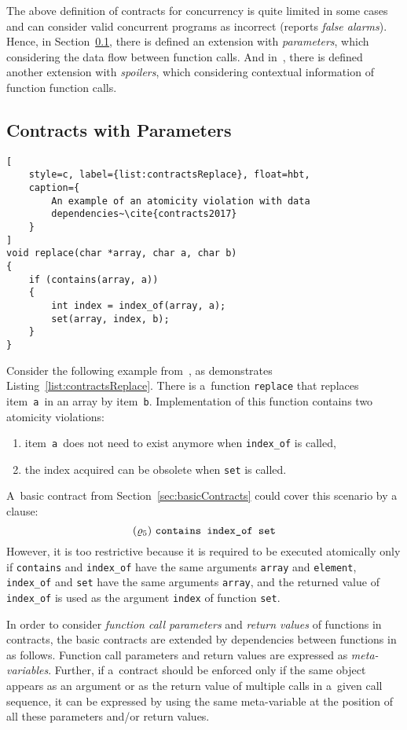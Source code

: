 The above definition of contracts for concurrency is quite limited in
some cases and can consider valid concurrent programs as incorrect (reports
\emph{false alarms}). Hence, in Section~\ref{sec:parameterContracts},
there is defined an extension with \emph{parameters}, which considering the
data flow between function calls. And in~\cite{contracts2017}, there
is defined another extension with \emph{spoilers}, which considering
contextual information of function function calls.


\subsection{Contracts with Parameters}
\label{sec:parameterContracts}

\begin{lstlisting}[
    style=c, label={list:contractsReplace}, float=hbt,
    caption={
        An example of an atomicity violation with data
        dependencies~\cite{contracts2017}
    }
]
void replace(char *array, char a, char b)
{
    if (contains(array, a))
    {
        int index = index_of(array, a);
        set(array, index, b);
    }
}
\end{lstlisting}

Consider the following example from~\cite{contracts2017}, as demonstrates
Listing~\ref{list:contractsReplace}. There is a~function \texttt{replace}
that replaces item~\texttt{a}~in an array by item~\texttt{b}. Implementation
of this function contains two atomicity violations:
\begin{enumerate}[label={(\roman*)}]
    \item 
        item~\texttt{a}~does not need to exist anymore when \texttt{index\_of}
        is called,
        
    \item
        the index acquired can be obsolete when \texttt{set} is called.
\end{enumerate}
A~basic contract from Section~\ref{sec:basicContracts} could cover
this scenario by a clause:
$$ (\varrho_5)\ \text{\texttt{contains index\_of set}} $$
However, it is too restrictive because it is required to be executed
atomically only if \texttt{contains} and \texttt{index\_of} have the same
arguments \texttt{array} and \texttt{element}, \texttt{index\_of} and
\texttt{set} have the same arguments \texttt{array}, and the returned value of
\texttt{index\_of} is used as the argument \texttt{index} of function
\texttt{set}.

In order to consider \emph{function call parameters} and \emph{return values} 
of functions in contracts, the basic contracts are extended by dependencies
between functions in~\cite{contracts2017} as follows. Function call parameters
and return values are expressed as \emph{meta-variables}. Further, if a~contract
should be enforced only if the same object appears as an argument or as
the return value of multiple calls in a~given call sequence, it can be expressed
by using the same meta-variable at the position of all these parameters
and/or return values.

